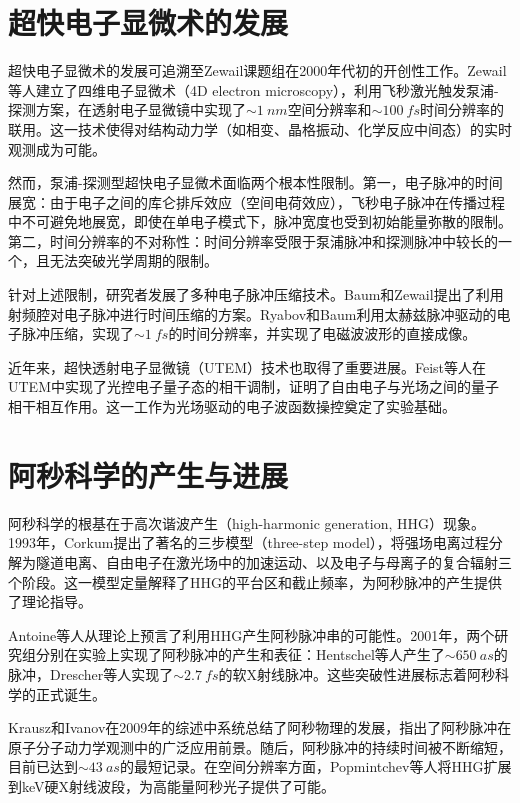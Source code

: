 \section{超快电子显微术的发展}
\label{sec:uem-dev}

超快电子显微术的发展可追溯至Zewail课题组在2000年代初的开创性工作。Zewail等人\cite{Zewail2010}建立了四维电子显微术（4D electron microscopy），利用飞秒激光触发泵浦-探测方案，在透射电子显微镜中实现了$\sim\SI{1}{nm}$空间分辨率和$\sim\SI{100}{fs}$时间分辨率的联用。这一技术使得对结构动力学（如相变、晶格振动、化学反应中间态）的实时观测成为可能。

然而，泵浦-探测型超快电子显微术面临两个根本性限制。第一，电子脉冲的时间展宽：由于电子之间的库仑排斥效应（空间电荷效应），飞秒电子脉冲在传播过程中不可避免地展宽，即使在单电子模式下，脉冲宽度也受到初始能量弥散的限制。第二，时间分辨率的不对称性：时间分辨率受限于泵浦脉冲和探测脉冲中较长的一个，且无法突破光学周期的限制。

针对上述限制，研究者发展了多种电子脉冲压缩技术。Baum和Zewail\cite{Baum2007}提出了利用射频腔对电子脉冲进行时间压缩的方案。Ryabov和Baum\cite{Ryabov2016}利用太赫兹脉冲驱动的电子脉冲压缩，实现了$\sim\SI{1}{fs}$的时间分辨率，并实现了电磁波波形的直接成像。

近年来，超快透射电子显微镜（UTEM）技术也取得了重要进展。Feist等人\cite{Feist2015}在UTEM中实现了光控电子量子态的相干调制，证明了自由电子与光场之间的量子相干相互作用。这一工作为光场驱动的电子波函数操控奠定了实验基础。

\section{阿秒科学的产生与进展}
\label{sec:attosecond-dev}

阿秒科学的根基在于高次谐波产生（high-harmonic generation, HHG）现象。1993年，Corkum\cite{Corkum1993}提出了著名的三步模型（three-step model），将强场电离过程分解为隧道电离、自由电子在激光场中的加速运动、以及电子与母离子的复合辐射三个阶段。这一模型定量解释了HHG的平台区和截止频率，为阿秒脉冲的产生提供了理论指导。

Antoine等人\cite{Antoine1996}从理论上预言了利用HHG产生阿秒脉冲串的可能性。2001年，两个研究组分别在实验上实现了阿秒脉冲的产生和表征：Hentschel等人\cite{Hentschel2001}产生了$\sim\SI{650}{as}$的脉冲，Drescher等人\cite{Drescher2001}实现了$\sim\SI{2.7}{fs}$的软X射线脉冲。这些突破性进展标志着阿秒科学的正式诞生。

Krausz和Ivanov\cite{Krausz2009}在2009年的综述中系统总结了阿秒物理的发展，指出了阿秒脉冲在原子分子动力学观测中的广泛应用前景。随后，阿秒脉冲的持续时间被不断缩短，目前已达到$\sim\SI{43}{as}$的最短记录\cite{Li2020_as}。在空间分辨率方面，Popmintchev等人\cite{Popmintchev2012}将HHG扩展到keV硬X射线波段，为高能量阿秒光子提供了可能。

